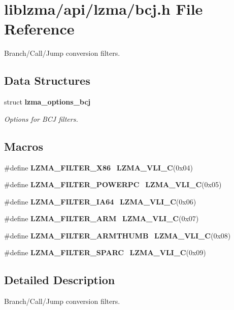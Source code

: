 \section{liblzma/api/lzma/bcj.h File Reference}
\label{bcj_8h}


Branch/\+Call/\+Jump conversion filters.  


\subsection*{Data Structures}
\begin{DoxyCompactItemize}
\item 
struct \textbf{ lzma\+\_\+options\+\_\+bcj}
\begin{DoxyCompactList}\small\item\em Options for B\+CJ filters. \end{DoxyCompactList}\end{DoxyCompactItemize}
\subsection*{Macros}
\begin{DoxyCompactItemize}
\item 
\#define \textbf{ L\+Z\+M\+A\+\_\+\+F\+I\+L\+T\+E\+R\+\_\+\+X86}~\textbf{ L\+Z\+M\+A\+\_\+\+V\+L\+I\+\_\+C}(0x04)
\item 
\#define \textbf{ L\+Z\+M\+A\+\_\+\+F\+I\+L\+T\+E\+R\+\_\+\+P\+O\+W\+E\+R\+PC}~\textbf{ L\+Z\+M\+A\+\_\+\+V\+L\+I\+\_\+C}(0x05)
\item 
\#define \textbf{ L\+Z\+M\+A\+\_\+\+F\+I\+L\+T\+E\+R\+\_\+\+I\+A64}~\textbf{ L\+Z\+M\+A\+\_\+\+V\+L\+I\+\_\+C}(0x06)
\item 
\#define \textbf{ L\+Z\+M\+A\+\_\+\+F\+I\+L\+T\+E\+R\+\_\+\+A\+RM}~\textbf{ L\+Z\+M\+A\+\_\+\+V\+L\+I\+\_\+C}(0x07)
\item 
\#define \textbf{ L\+Z\+M\+A\+\_\+\+F\+I\+L\+T\+E\+R\+\_\+\+A\+R\+M\+T\+H\+U\+MB}~\textbf{ L\+Z\+M\+A\+\_\+\+V\+L\+I\+\_\+C}(0x08)
\item 
\#define \textbf{ L\+Z\+M\+A\+\_\+\+F\+I\+L\+T\+E\+R\+\_\+\+S\+P\+A\+RC}~\textbf{ L\+Z\+M\+A\+\_\+\+V\+L\+I\+\_\+C}(0x09)
\end{DoxyCompactItemize}


\subsection{Detailed Description}
Branch/\+Call/\+Jump conversion filters. 



